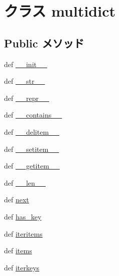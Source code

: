 \hypertarget{classm5_1_1util_1_1multidict_1_1multidict}{
\section{クラス multidict}
\label{classm5_1_1util_1_1multidict_1_1multidict}
}
\subsection*{Public メソッド}
\begin{DoxyCompactItemize}
\item 
def \hyperlink{classm5_1_1util_1_1multidict_1_1multidict_ac775ee34451fdfa742b318538164070e}{\_\-\_\-init\_\-\_\-}
\item 
def \hyperlink{classm5_1_1util_1_1multidict_1_1multidict_aa7a4b9bc0941308e362738503137460e}{\_\-\_\-str\_\-\_\-}
\item 
def \hyperlink{classm5_1_1util_1_1multidict_1_1multidict_ad8b9328939df072e4740cd9a63189744}{\_\-\_\-repr\_\-\_\-}
\item 
def \hyperlink{classm5_1_1util_1_1multidict_1_1multidict_a31ecdf34e79a47aea99a17eea32b7ac2}{\_\-\_\-contains\_\-\_\-}
\item 
def \hyperlink{classm5_1_1util_1_1multidict_1_1multidict_a5fa6cfe34d7e2fe5b9c38e1d74fffac8}{\_\-\_\-delitem\_\-\_\-}
\item 
def \hyperlink{classm5_1_1util_1_1multidict_1_1multidict_a09195b01147e970ca71c48b57f653940}{\_\-\_\-setitem\_\-\_\-}
\item 
def \hyperlink{classm5_1_1util_1_1multidict_1_1multidict_a50d766f4276c3d8fe330ac8cd344a75f}{\_\-\_\-getitem\_\-\_\-}
\item 
def \hyperlink{classm5_1_1util_1_1multidict_1_1multidict_af6412d48d9a71eac81e3195b52455aaa}{\_\-\_\-len\_\-\_\-}
\item 
def \hyperlink{classm5_1_1util_1_1multidict_1_1multidict_a1add561a14f78ba11ea73195789b60da}{next}
\item 
def \hyperlink{classm5_1_1util_1_1multidict_1_1multidict_a72fde7d0b9b935bbe0709da457c0a46e}{has\_\-key}
\item 
def \hyperlink{classm5_1_1util_1_1multidict_1_1multidict_a13d39839ad1cfd4c47f524735933c0bf}{iteritems}
\item 
def \hyperlink{classm5_1_1util_1_1multidict_1_1multidict_a717291221885735d6870d7179083ec07}{items}
\item 
def \hyperlink{classm5_1_1util_1_1multidict_1_1multidict_a44560b0b40dfcd2069b980760783cc7b}{iterkeys}

\end{DoxyCompactItemize}
